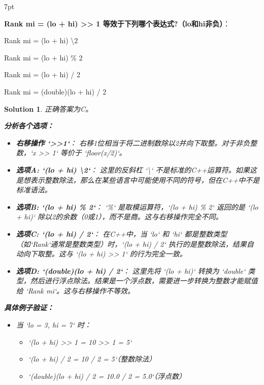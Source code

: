 \documentclass[UTF8]{report}
\newtheorem{solution}{Solution}
\theoremstyle{MyLineTheoremStyle} %
\theoremstyle{MyBlockTheoremStyle} %
\theoremstyle{MySubsubsectionStyle} %
\newenvironment{graybox}{%
        \def\FrameCommand{%
        \hspace{1pt}%
        {\color{gray}\small \vrule width 2pt}%
        {\color{graybox_color}\vrule width 4pt}%
        \colorbox{graybox_color}%
        }%
        \MakeFramed{\advance\hsize-\width\FrameRestore}%
        \noindent\hspace{-4.55pt}%
        \begin{adjustwidth}{}{7pt}%
        \vspace{2pt}\vspace{2pt}%
        }
        {%
        \vspace{2pt}\end{adjustwidth}\endMakeFramed%
        }
\begin{document}
\begin{graybox}
\textbf{Rank mi = (lo + hi) >> 1 等效于下列哪个表达式?（lo和hi非负）}：
\begin{circledenum}
    \item Rank mi = (lo + hi) \textbackslash 2
    \item Rank mi = (lo + hi) \% 2
    \item Rank mi = (lo + hi) / 2
    \item Rank mi = (double)(lo + hi) / 2
\end{circledenum}
\end{graybox}

\begin{solution}
正确答案为C。

\textbf{分析各个选项：}

\begin{itemize}
    \item \textbf{右移操作 `>>1`}：
    右移1位相当于将二进制数除以2并向下取整。对于非负整数，`x >> 1` 等价于 `floor(x/2)`。

    \item \textbf{选项A: `(lo + hi) \textbackslash 2`}：
    这里的反斜杠 `\textbackslash` 不是标准的C++运算符。如果这是想表示整数除法，那么在某些语言中可能使用不同的符号，但在C++中不是标准语法。

    \item \textbf{选项B: `(lo + hi) \% 2`}：
    `\%` 是取模运算符，`(lo + hi) \% 2` 返回的是 `(lo + hi)` 除以2的余数（0或1），而不是商。这与右移操作完全不同。

    \item \textbf{选项C: `(lo + hi) / 2`}：
    在C++中，当 `lo` 和 `hi` 都是整数类型（如`Rank`通常是整数类型）时，`(lo + hi) / 2` 执行的是整数除法，结果自动向下取整。这与 `(lo + hi) >> 1` 的行为完全一致。

    \item \textbf{选项D: `(double)(lo + hi) / 2`}：
    这里先将 `(lo + hi)` 转换为 `double` 类型，然后进行浮点除法。结果是一个浮点数，需要进一步转换为整数才能赋值给 `Rank mi`。这与右移操作不等效。
\end{itemize}

\textbf{具体例子验证：}
\begin{itemize}
    \item 当 `lo = 3, hi = 7` 时：
    \begin{itemize}
        \item `(lo + hi) >> 1 = 10 >> 1 = 5`
        \item `(lo + hi) / 2 = 10 / 2 = 5`（整数除法）
        \item `(double)(lo + hi) / 2 = 10.0 / 2 = 5.0`（浮点数）
    \end{itemize}
    

\end{itemize}
\end{solution}
\end{document}

